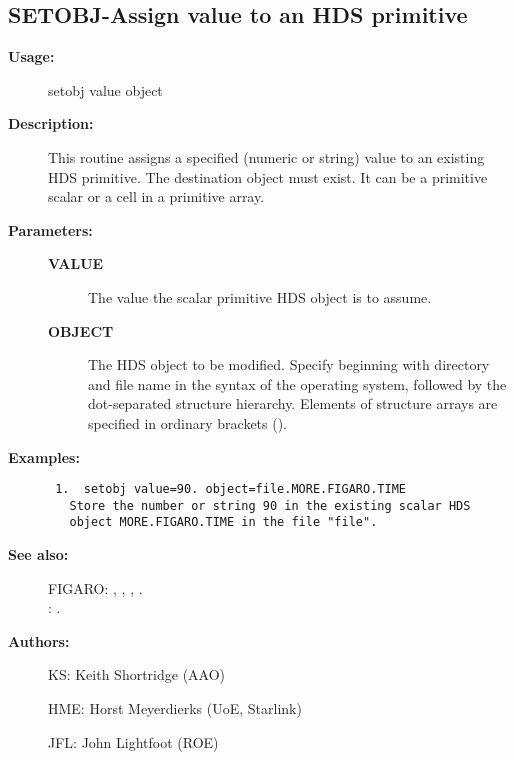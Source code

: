 \subsection{SETOBJ-\label{SETOBJ}Assign value to an HDS primitive}
\begin{description}

\item [{\bf Usage:}]
 setobj value object

\item [{\bf Description:}]
 This routine assigns a specified (numeric or string) value to an
 existing HDS primitive. The destination object must exist. It can
 be a primitive scalar or a cell in a primitive array.

\item [{\bf Parameters:}]
\begin{description}
\item [{\bf VALUE}]
 The value the scalar primitive HDS object is to assume.
\item [{\bf OBJECT}]
 The HDS object to be modified. Specify beginning with directory
 and file name in the syntax of the operating system, followed by
 the dot-separated structure hierarchy. Elements of structure
 arrays are specified in ordinary brackets ().
\end{description}

\item [{\bf Examples:}]
\begin{verbatim}
 1.  setobj value=90. object=file.MORE.FIGARO.TIME
   Store the number or string 90 in the existing scalar HDS
   object MORE.FIGARO.TIME in the file "file".

\end{verbatim}

\item [{\bf See also:}]
FIGARO: , , , .\\
: .\\

\item [{\bf Authors:}]
 KS: Keith Shortridge (AAO)

 HME: Horst Meyerdierks (UoE, Starlink)

 JFL: John Lightfoot (ROE)
\end{description}
